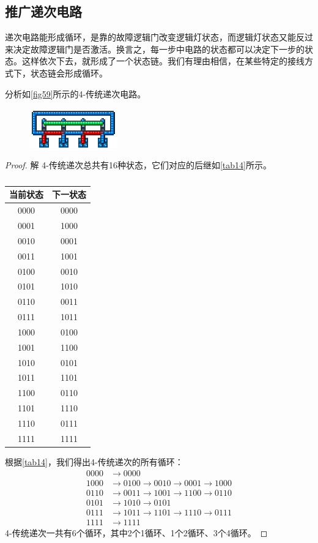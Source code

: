 \subsection{推广递次电路}
递次电路能形成循环，是靠的故障逻辑门改变逻辑灯状态，而逻辑灯状态又能反过来决定故障逻辑门是否激活。换言之，每一步中电路的状态都可以决定下一步的状态。这样依次下去，就形成了一个状态链。我们有理由相信，在某些特定的接线方式下，状态链会形成循环。

\begin{example}
分析如\autoref{fig59}所示的4-传统递次电路。
\begin{figure}[!ht]
\centering
\includegraphics{images/416.png}
\caption{}\label{fig59}
\end{figure}
\end{example}
\begin{proof}解
4-传统递次总共有16种状态，它们对应的后继如\autoref{tab14}所示。
\begin{table}[!ht]
\centering
\begin{tabular}{|c|c|}
\hline
当前状态&下一状态\\\hline
0000&0000\\\hline
0001&1000\\\hline
0010&0001\\\hline
0011&1001\\\hline
0100&0010\\\hline
0101&1010\\\hline
0110&0011\\\hline
0111&1011\\\hline
1000&0100\\\hline
1001&1100\\\hline
1010&0101\\\hline
1011&1101\\\hline
1100&0110\\\hline
1101&1110\\\hline
1110&0111\\\hline
1111&1111\\\hline
\end{tabular}
\caption{}\label{tab14}
\end{table}

根据\autoref{tab14}，我们得出4-传统递次的所有循环：
\begin{align*}
0000&\to 0000\\
1000&\to 0100\to 0010\to 0001\to 1000\\
0110&\to 0011\to 1001\to 1100\to 0110\\
0101&\to 1010\to 0101\\
0111&\to 1011\to 1101\to 1110\to 0111\\
1111&\to 1111
\end{align*}
4-传统递次一共有6个循环，其中2个1循环、1个2循环、3个4循环。
\end{proof}

